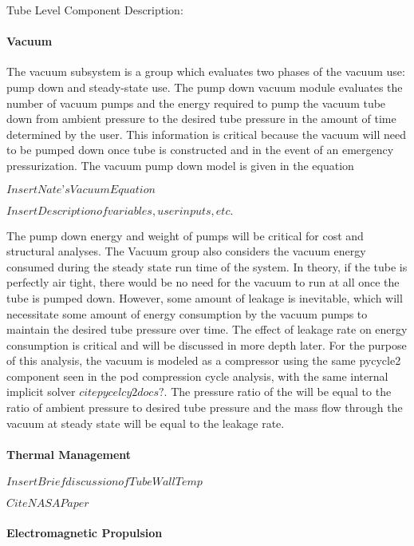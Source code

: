 Tube Level Component Description:

\paragraph{Vacuum}

The vacuum subsystem is a group which evaluates two phases of the vacuum use: pump down and steady-state use. The pump down vacuum module evaluates the number of vacuum pumps and the energy required to pump the vacuum tube down from ambient pressure to the desired tube pressure in the amount of time determined by the user. This information is critical because the vacuum will need to be pumped down once tube is constructed and in the event of an emergency pressurization. The vacuum pump down model is given in the equation

$Insert Nate’s Vacuum Equation$

$Insert Description of variables, user inputs, etc.$

The pump down energy and weight of pumps will be critical for cost and structural analyses.
The Vacuum group also considers the vacuum energy consumed during the steady state run time of the system. In theory, if the tube is perfectly air tight, there would be no need for the vacuum to run at all once the tube is pumped down. However, some amount of leakage is inevitable, which will necessitate some amount of energy consumption by the vacuum pumps to maintain the desired tube pressure over time. The effect of leakage rate on energy consumption is critical and will be discussed in more depth later. For the purpose of this analysis, the vacuum is modeled as a compressor using the same pycycle2 component seen in the pod compression cycle analysis, with the same internal implicit solver $cite pycelcy2 docs?$. The pressure ratio of the will be equal to the ratio of ambient pressure to desired tube pressure and the mass flow through the vacuum at steady state will be equal to the leakage rate.

\paragraph{Thermal Management}

$Insert Brief discussion of Tube Wall Temp$

$Cite NASA Paper$

\paragraph{Electromagnetic Propulsion}

